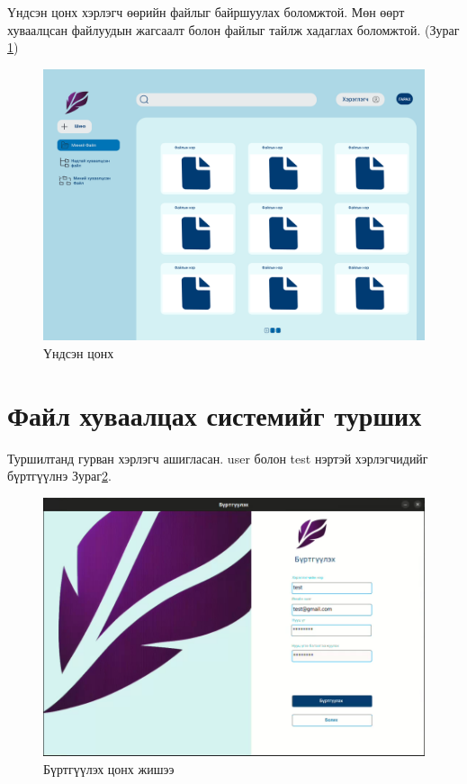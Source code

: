 \noindent Үндсэн цонх хэрлэгч өөрийн файлыг байршуулах боломжтой. Мөн өөрт хуваалцсан файлуудын жагсаалт болон файлыг тайлж хадаглах боломжтой. (Зураг \ref{fig:home})
\begin{figure}[H]
    \centering
    \includegraphics[scale=0.25]{Figures/ui/home_with_files.png}
    \caption{Үндсэн цонх}
    \label{fig:home}
\end{figure}

\section{Файл хуваалцах системийг турших}
Туршилтанд гурван хэрлэгч ашигласан. user болон test нэртэй хэрлэгчидийг бүртгүүлнэ Зураг\ref{fig:register_example}.
\begin{figure}[H]
    \centering
    \includegraphics[scale=0.3]{Figures/example/register.png}
    \caption{Бүртгүүлэх цонх жишээ}
    \label{fig:register_example}
\end{figure}

